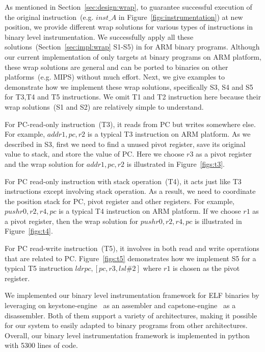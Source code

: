 As mentioned in Section~\ref{sec:design:wrap}, to guarantee successful execution of the original instruction~(e.g. $inst\_A$ in Figure~\ref{figs:instrumentation}) at new position, we provide different wrap solutions for various types of instructions in binary level instrumentation. We successfully apply all these solutions~(Section~\ref{sec:impl:wrap} S1-S5) in \sysname for ARM binary programs. Although our current implementation of \sysname only targets at binary programs on ARM platform, these wrap solutions are general and can be ported to binaries on other platforms~(e.g. MIPS) without much effort. Next, we give examples to demonstrate how we implement these wrap solutions, specifically S3, S4 and S5 for T3,T4 and T5 instructions. We omit T1 and T2 instruction here because their wrap solutions~(S1 and S2) are relatively simple to understand.

For PC-read-only instruction~(T3),  it reads from PC but writes somewhere else. For example, $add r1, pc, r2$ is a typical T3 instruction on ARM platform. As we described in S3, first we need to find a unused pivot register, save its original value to stack, and store the value of PC. Here we choose $r3$ as a pivot register and the wrap solution for $add r1, pc, r2$ is illustrated in Figure~\ref{figs:t3}.

For PC read-only instruction with stack operation~(T4), it acts just like T3 instructions except involving stack operation. As a result, we need to coordinate the position stack for PC, pivot register and other registers. For example, $push {r0, r2, r4, pc}$ is a typical T4 instruction on ARM platform. If we choose  $r1$ as a
pivot register, then the wrap solution for $push {r0, r2, r4, pc}$ is illustrated in Figure~\ref{figs:t4}.

For PC read-write instruction~(T5), it involves in both read and write operations that are related to PC. Figure~\ref{figs:t5} demonstrates how we implement S5 for a typical T5 instruction $ldr pc, [pc, r3, lsl\#2]$ where $r1$ is chosen as the pivot register.


We implemented our binary level instrumentation framework for ELF binaries by leveraging on keystone-engine~\cite{keystone} as an assembler and capstone-engine~\cite{capstone} as a disassembler. Both of them support a variety of architectures, making it possible for our system to easily adapted to binary programs from other architectures. Overall, our binary level instrumentation framework is implemented in python with 5300 lines of code.


